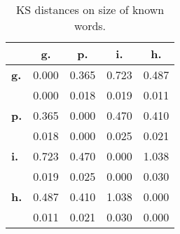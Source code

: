 \begin{table}[h!]
\begin{center}
\begin{tabular}{| l || c | c | c | c |}\hline
 & {\bf g.} & {\bf p.} & {\bf i.} & {\bf h.} \\\hline\hline
{\bf g.} & 0.000 & 0.365 & 0.723 & 0.487 \\
{\bf } & 0.000 & 0.018 & 0.019 & 0.011 \\\hline
{\bf p.} & 0.365 & 0.000 & 0.470 & 0.410 \\
{\bf } & 0.018 & 0.000 & 0.025 & 0.021 \\\hline
{\bf i.} & 0.723 & 0.470 & 0.000 & 1.038 \\
{\bf } & 0.019 & 0.025 & 0.000 & 0.030 \\\hline
{\bf h.} & 0.487 & 0.410 & 1.038 & 0.000 \\
{\bf } & 0.011 & 0.021 & 0.030 & 0.000 \\\hline
\end{tabular}
\caption{KS distances on size of known words.}
\end{center}
\end{table}